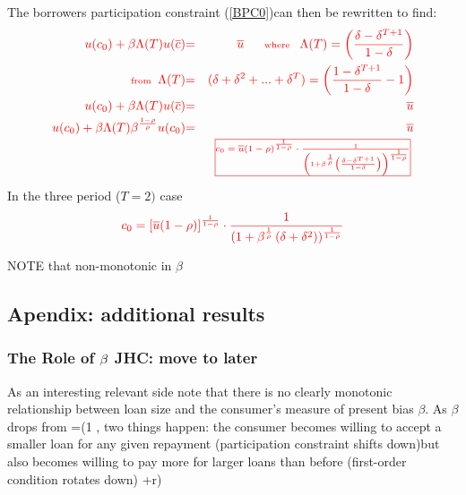 \documentclass[11pt]{article}%
\providecommand{\DIFadd}[1]{{\protect\color{blue} \sf #1}} %
\providecommand{\DIFdel}[1]{{\protect\color{red} \scriptsize #1}} %
\providecommand{\DIFaddbegin}{} %
\providecommand{\DIFaddend}{} %
\providecommand{\DIFdelbegin}{} %
\providecommand{\DIFdelend}{} %
\begin{document}
{%
\DIFdel{The borrowers participation constraint (\ref{BPC0})can then be rewritten to
find:%
}\begin{align*}\DIFdel{
u(c_{0})+\beta \Lambda (T)u(\overline{c}) }&\DIFdel{=}&\DIFdel{\overline{u}\text{ \ \ \ \ \
where \ \ }\Lambda (T)=\left( \frac{\delta -\delta ^{T+1}}{1-\delta }\right)
}\\
\DIFdel{\text{from \ }\Lambda (T) }&\DIFdel{=}&\DIFdel{(\delta +\delta ^{2}+...+\delta ^{T})=\left( 
\frac{1-\delta ^{T+1}}{1-\delta }-1\right) }\\
\DIFdel{u(c_{0})+\beta \Lambda (T)u(\overline{c}) }&\DIFdel{=}&\DIFdel{\overline{u} }\\
\DIFdel{u(c_{0})+\beta \Lambda (T)\beta ^{\frac{1-\rho }{\rho }}u(c_{0}) }&\DIFdel{=}&%
\DIFdel{\overline{u} }\\
&&\DIFdel{\frame{$c_{0}=\overline{u}(1-\rho )^{\frac{1}{1-\rho }}\cdot \frac{1}{%
\left( 1+\beta ^{\frac{1}{\rho }}\left( \frac{\delta -\delta ^{T+1}}{%
1-\delta }\right) \right) ^{\frac{1}{1-\rho }}}$}\text{ }
}\end{align*}%
\DIFdel{In the three period ($T=2)$ case 
}\begin{displaymath}\DIFdel{
c_{0}=\left[ \overline{u}(1-\rho )\right] ^{\frac{1}{1-\rho }}\cdot \frac{1}{%
(1+\beta ^{\frac{1}{\rho }}\left( \delta +\delta ^{2}\right) )^{\frac{1}{%
1-\rho }}}
}\end{displaymath}

\DIFdel{NOTE that non-monotonic in $\beta $
}%

\subsection{\DIFdel{Apendix: additional results}}
\addtocounter{subsection}{-1}%

\subsubsection{\DIFdel{The Role of $\protect\beta $ }%
\DIFdel{JHC: move to later}%
}
\addtocounter{subsubsection}{-1}%

\DIFdel{As an interesting relevant side note that there is no clearly monotonic
relationship between loan size and the consumer's measure of present bias $%
\beta $. As $\beta $ drops from }\DIFdelend \DIFaddbegin \DIFadd{=\beta\delta(}\DIFaddend 1\DIFdelbegin \DIFdel{, two things happen: the consumer becomes
willing to accept a smaller loan for any given repayment (participation
constraint shifts down)but also becomes willing to pay more for larger
loans than before (first-order condition rotates down)}\DIFdelend \DIFaddbegin \DIFadd{+r)}\overline{c}\DIFadd{^{-\rho}$ so
\[
\overline{c}=\beta^{\frac{1}{\rho}}c_{0}%
\]


}}
\end{document}
